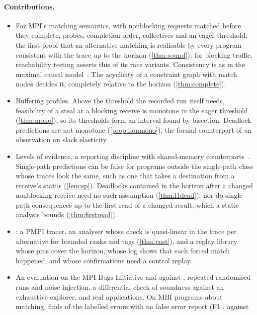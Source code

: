 \paragraph{Contributions.}
\begin{itemize}[leftmargin=*]
\item For MPI's matching semantics, with nonblocking requests matched before they complete,
  probes, completion order, collectives and an eager threshold, the first proof that an
  alternative matching is realisable by every program consistent with the trace up to the
  horizon (\cref{thm:sound}); for blocking traffic, reachability testing asserts this of its
  race variants. Consistency is as in the maximal causal model~\citep{serbanuta12mcm}. The
  acyclicity of a constraint graph with match nodes decides it, completely relative to the
  horizon (\cref{thm:complete}).
\item Buffering profiles. Above the threshold the recorded run itself needs, feasibility of a
  steal at a blocking receive is monotone in the eager threshold (\cref{thm:mono}), so its
  thresholds form an interval found by bisection. Deadlock predictions are not monotone
  (\cref{prop:nonmono}), the formal counterpart of an observation on slack
  elasticity~\citep{vakkalanka10slack}.
\item Levels of evidence, a reporting discipline with shared-memory
  counterparts~\citep{kalhauge18sound,farzan12exceptionull}. Single-path predictions can be
  false for programs outside the single-path class whose traces look the same, such as one
  that takes a destination from a receive's status (\cref{lem:sp}). Deadlocks contained in
  the horizon after a changed nonblocking receive need no such assumption (\cref{thm:l1dead}),
  nor do single-path consequences up to the first read of a changed result, which a static
  analysis bounds (\cref{thm:firstread}).
\item \tool: a PMPI tracer, an analyser whose check is quasi-linear in the trace per
  alternative for bounded ranks and tags (\cref{thm:cost}), and a replay library whose pins
  cover the horizon, whose log shows that each forced match happened, and whose confirmations
  need a control replay.
\item An evaluation on the MPI Bugs Initiative and \MBB against \MUST, repeated randomised runs
  and noise injection, a differential check of soundness against an exhaustive explorer, and
  real applications. On \nMBIprogs MBI programs about matching, \tool finds \nMBItpunion of
  the \nMBIerrors labelled errors with no false error report (F1 \MBIfoneunion, against

\end{itemize}
